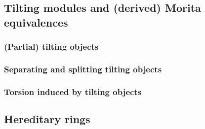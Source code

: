             \begin{example}
                
            \end{example}
            \begin{example}
                
            \end{example}
            \begin{example}
                
            \end{example}
            \begin{example}
                
            \end{example}
            \begin{example}
                
            \end{example}
        
    \subsection{Tilting modules and (derived) Morita equivalences}
        \subsubsection{(Partial) tilting objects}
        
        \subsubsection{Separating and splitting tilting objects}
        
        \subsubsection{Torsion induced by tilting objects}
        
    \subsection{Hereditary rings}    
